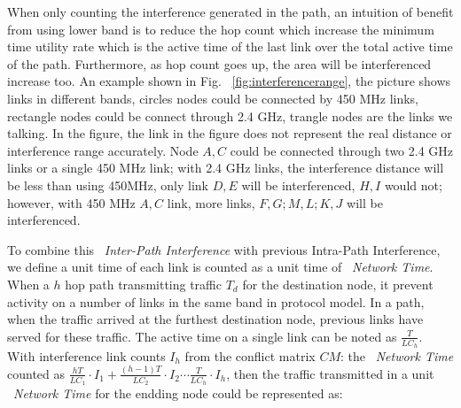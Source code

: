 When only counting the interference generated in the path,
an intuition of benefit from using lower band is to reduce the hop count which increase the minimum time utility rate which is the active time of the last link over the total active time of the path. 
Furthermore, as hop count goes up, the area will be interferenced increase too. An example shown in Fig. ~\ref{fig:interferencerange}, 
the picture shows links in different bands, circles nodes could be connected by 450 MHz links, rectangle nodes could be connect through 2.4 GHz, trangle nodes are the links we talking. 
In the figure, the link in the figure does not represent the real distance or interference range accurately.
Node $A,C$ could be connected through two 2.4 GHz links or a single 450 MHz link; with 2.4 GHz links, the interference distance will be less than using 450MHz, only link $D,E$ will be interferenced, $H,I$ would not; however, with 450 MHz $A,C$ link, more links, $F,G;M,L;K,J$ will be interferenced. 

To combine this ~\emph{Inter-Path Interference} with previous Intra-Path Interference, 
we define a unit time of each link is counted as a unit time of ~\emph{Network Time}. 
When a $h$ hop path transmitting traffic $T_d$ for the destination node, it prevent activity on a number of links in the same band in protocol model. 
In a path, when the traffic arrived at the furthest destination node, previous links have served for these traffic.
The active time on a single link can be noted as 
$\frac{T}{LC_h}$. 
With interference link counts $I_h$ from the conflict matrix $CM$:
the ~\emph{Network Time} counted as 
$\frac{hT}{LC_1}\cdot I_1 + \frac{(h-1)T}{LC_2}\cdot I_2 \cdots \frac{T}{LC_h}\cdot I_h$, 
then the traffic transmitted in a unit ~\emph{Network Time}  for the endding node could be represented as:



